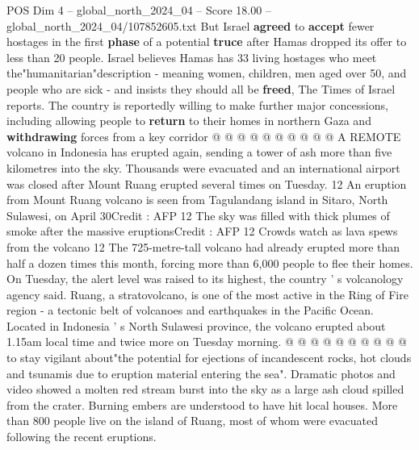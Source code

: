 \begin{textsample}{POS Dim 4 – global\_north\_2024\_04 – Score 18.00 – global\_north\_2024\_04/107852605.txt}
But Israel \textbf{agreed} to \textbf{accept} fewer hostages in the first \textbf{phase} of a potential \textbf{truce} after Hamas dropped its offer to less than 20 people.
Israel believes Hamas has 33 living hostages who meet the"humanitarian"description - meaning women, children, men aged over 50, and people who are sick - and insists they should all be \textbf{freed}, The Times of Israel reports.
The country is reportedly willing to make further major concessions, including allowing people to \textbf{return} to their homes in northern Gaza and \textbf{withdrawing} forces from a key corridor @ @ @ @ @ @ @ @ @ @ A REMOTE volcano in Indonesia has erupted again, sending a tower of ash more than five kilometres into the sky.
Thousands were evacuated and an international airport was closed after Mount Ruang erupted several times on Tuesday. 12 An eruption from Mount Ruang volcano is seen from Tagulandang island in Sitaro, North Sulawesi, on April 30Credit : AFP 12 The sky was filled with thick plumes of smoke after the massive eruptionsCredit : AFP 12 Crowds watch as lava spews from the volcano 12 The 725-metre-tall volcano had already erupted more than half a dozen times this month, forcing more than 6,000 people to flee their homes.
On Tuesday, the alert level was raised to its highest, the country ' s volcanology agency said.
Ruang, a stratovolcano, is one of the most active in the Ring of Fire region - a tectonic belt of volcanoes and earthquakes in the Pacific Ocean.
Located in Indonesia ' s North Sulawesi province, the volcano erupted about 1.15am local time and twice more on Tuesday morning. @ @ @ @ @ @ @ @ @ @ to stay vigilant about"the potential for ejections of incandescent rocks, hot clouds and tsunamis due to eruption material entering the sea".
Dramatic photos and video showed a molten red stream burst into the sky as a large ash cloud spilled from the crater.
Burning embers are understood to have hit local houses.
More than 800 people live on the island of Ruang, most of whom were evacuated following the recent eruptions.

\end{textsample}
